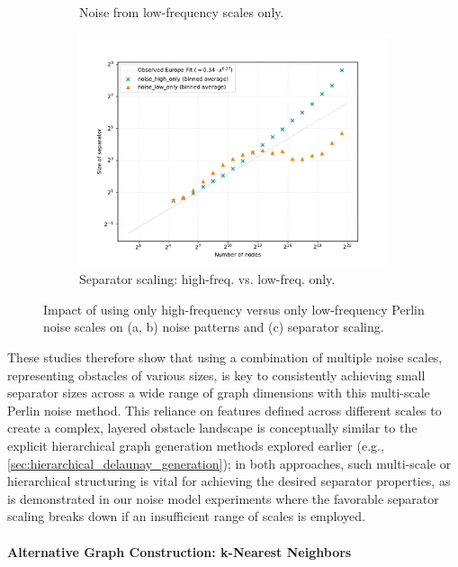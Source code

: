 \begin{figure}[tbhp]
\begin{subfigure}{0.25\linewidth}
		\caption{Noise from low-frequency scales only.}
		\label{fig:noise_low_freq_viz}
	\end{subfigure}
	\hfill
    \begin{subfigure}{0.45\linewidth}
		\centering
		\includegraphics[width=\linewidth]{graphics/noise_high_vs_low_only.pdf}
		\caption{Separator scaling: high-freq. vs. low-freq. only.}
		\label{fig:noise_ablation_sep_plot}
	\end{subfigure}
	\caption{Impact of using only high-frequency versus only low-frequency Perlin noise scales on (a, b) noise patterns and (c) separator scaling.}
	\label{fig:noise_layer_ablation}
\end{figure}

These studies therefore show that using a combination of multiple noise scales, representing obstacles of various sizes, is key to consistently achieving small separator sizes across a wide range of graph dimensions with this multi-scale Perlin noise method.
This reliance on features defined across different scales to create a complex, layered obstacle landscape is conceptually similar to the explicit hierarchical graph generation methods explored earlier (e.g., \cref{sec:hierarchical_delaunay_generation}); in both approaches, such multi-scale or hierarchical structuring is vital for achieving the desired separator properties, as is demonstrated in our noise model experiments where the favorable separator scaling breaks down if an insufficient range of scales is employed.



\paragraph{Alternative Graph Construction: k-Nearest Neighbors}

